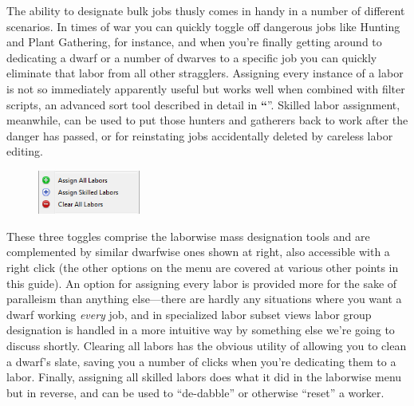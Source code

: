 \documentclass[]{article}
\newcommand{\jump}[1] {\textbf{``\nameref{sec:#1}}''}
\begin{document}
The ability to designate bulk jobs thusly comes in handy in a number of different scenarios. In times of
war you can quickly toggle off dangerous jobs like Hunting and Plant Gathering, for instance, and when
you're finally getting around to dedicating a dwarf or a number of dwarves to a specific job you can
quickly eliminate that labor from all other stragglers. Assigning every instance of a labor is not so
immediately apparently useful but works well when combined with filter scripts, an advanced sort tool
described in detail in \jump{Filter Scripts}. Skilled labor assignment, meanwhile, can
be used to put those hunters and gatherers back to work after the danger has passed, or for reinstating
jobs accidentally deleted by careless labor editing.

\begin{figure}
\vspace{-20pt}
  \begin{center}
    \includegraphics[width=0.3\textwidth]{Sec2Fig5-2}
  \end{center}
\vspace{-10pt}
\end{figure}
These three toggles comprise the laborwise mass designation tools and are complemented by similar
dwarfwise ones shown at right, also accessible with a right click (the other options on the menu are
covered at various other points in this guide). An option for assigning every labor is provided more for
the sake of paralleism than anything else---there are hardly any situations where you want a dwarf
working \emph{every} job, and in specialized labor subset views labor group designation is handled in a
more intuitive way by something else we're going to discuss shortly. Clearing all labors has the obvious
utility of allowing you to clean a dwarf's slate, saving you a number of clicks when you're dedicating
them to a labor. Finally, assigning all skilled labors does what it did in the laborwise menu but in
reverse, and can be used to ``de-dabble'' or otherwise ``reset'' a worker.
\end{document}
